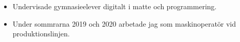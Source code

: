 \documentclass[10pt,a4paper,ragged2e]{altacv}
\begin{document}
\divider

    \begin{itemize}
    \item Undervisade gymnasieelever digitalt i matte och programmering.
\end{itemize}

\divider

\begin{itemize}
    \item Under sommrarna 2019 och 2020 arbetade jag som maskinoperatör vid produktionslinjen.
\end{itemize}

\newpage

\end{document}
